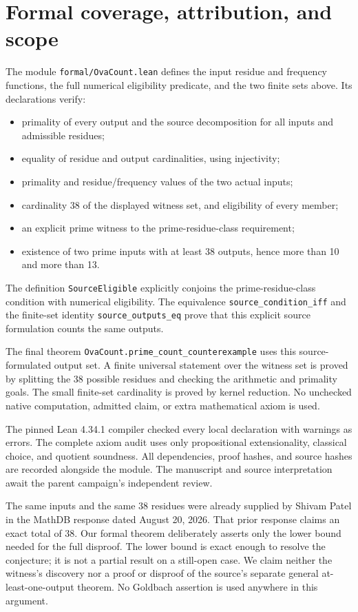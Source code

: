 \documentclass[11pt]{article}
\begin{document}
\section{Formal coverage, attribution, and scope}
The module \texttt{formal/OvaCount.lean} defines the input residue and frequency functions, the full numerical eligibility predicate, and the two finite sets above. Its declarations verify:
\begin{itemize}
\item primality of every output and the source decomposition for all inputs and admissible residues;
\item equality of residue and output cardinalities, using injectivity;
\item primality and residue/frequency values of the two actual inputs;
\item cardinality 38 of the displayed witness set, and eligibility of every member;
\item an explicit prime witness to the prime-residue-class requirement;
\item existence of two prime inputs with at least 38 outputs, hence more than 10 and more than 13.
\end{itemize}
The definition \texttt{SourceEligible} explicitly conjoins the prime-residue-class condition with numerical eligibility. The equivalence \texttt{source\_condition\_iff} and the finite-set identity \texttt{source\_outputs\_eq} prove that this explicit source formulation counts the same outputs.

The final theorem \texttt{OvaCount.prime\_count\_counterexample} uses this source-formulated output set. A finite universal statement over the witness set is proved by splitting the 38 possible residues and checking the arithmetic and primality goals. The small finite-set cardinality is proved by kernel reduction. No unchecked native computation, admitted claim, or extra mathematical axiom is used.

The pinned Lean 4.34.1 compiler checked every local declaration with warnings as errors. The complete axiom audit uses only propositional extensionality, classical choice, and quotient soundness. All dependencies, proof hashes, and source hashes are recorded alongside the module. The manuscript and source interpretation await the parent campaign's independent review.

The same inputs and the same 38 residues were already supplied by Shivam Patel in the MathDB response dated August 20, 2026. That prior response claims an exact total of 38. Our formal theorem deliberately asserts only the lower bound needed for the full disproof. The lower bound is exact enough to resolve the conjecture; it is not a partial result on a still-open case. We claim neither the witness's discovery nor a proof or disproof of the source's separate general at-least-one-output theorem. No Goldbach assertion is used anywhere in this argument.
\end{document}
